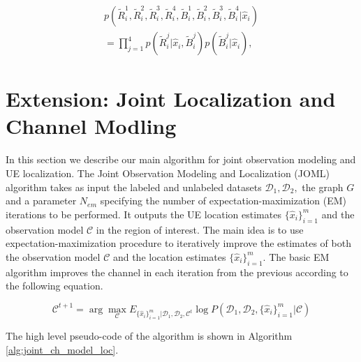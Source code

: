 \documentclass[conference, 10pt]{IEEEtran}
\begin{document}
\begin{equation} 
\begin{split}
	p(\tilde{R}^1_i, \tilde{R}^2_i, \tilde{R}^3_i,\tilde{R}^4_i, \tilde{B}^1_i, \tilde{B}^2_i, \tilde{B}^3_i, \tilde{B}^4_i|\hat{x}_{i})
	\\
	=\prod_{j=1}^4 p(\tilde{R}^j_i|\hat{x}_{i}, \tilde{B}^j_i)p(\tilde{B}^j_i|\hat{x}_{i}),
\end{split}
\label{eqn:combined}
\end{equation}


\section{Extension: Joint Localization and Channel Modling}
\label{sec:extensionalgo}
In this section we describe our main algorithm for joint observation modeling and UE
localization. The Joint Observation Modeling and Localization (JOML) algorithm takes
as input the labeled and unlabeled datasets $\mathcal{D}_1,\mathcal{D}_2,$ the
graph $G$ and a parameter $N_{em}$ specifying the number of
expectation-maximization (EM) iterations to be performed. It outputs the UE
location estimates $\{\hat{x}_i\}_{i=1}^m$ and the observation model $\mathcal{C}$
in the region of interest. The main idea is to use expectation-maximization
procedure to iteratively improve the estimates of both the observation model
$\mathcal{C}$ and the location estimates $\{\hat{x}_i\}_{i=1}^m.$ The basic EM
algorithm improves the channel in each iteration from the previous according to
the following equation.

\begin{equation}
\mathcal{C}^{t+1} = \arg \max_{\mathcal{C}} E_{\{\hat{x}_i\}_{i=1}^m |\mathcal{D}_1,\mathcal{D}_2,\mathcal{C}^t} \log  P(\mathcal{D}_1,\mathcal{D}_2,\{\hat{x}_i\}_{i=1}^m|\mathcal{C}) \label{eq:EM}
\end{equation}

The high level pseudo-code of the algorithm is shown in Algorithm \ref{alg:joint_ch_model_loc}.  

\end{document}
